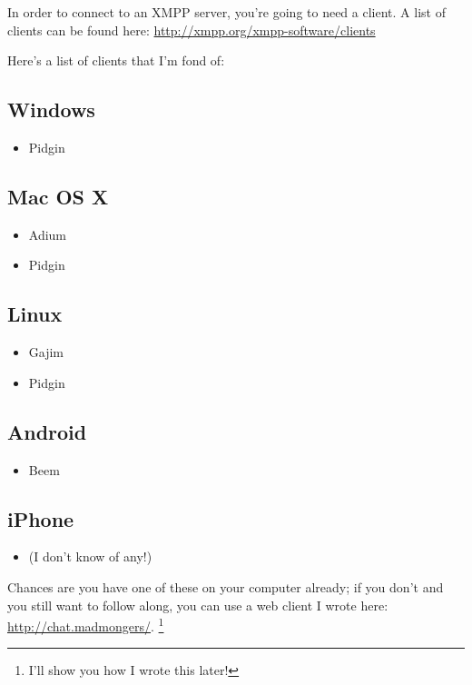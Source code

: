 \newpage

In order to connect to an XMPP server, you're going to need a client.  A list of clients
can be found here: \url{http://xmpp.org/xmpp-software/clients}

Here's a list of clients that I'm fond of:

\subsection*{Windows}

\begin{itemize}
\item Pidgin
\end{itemize}

\subsection*{Mac OS X}

\begin{itemize}
\item Adium
\item Pidgin
\end{itemize}

\subsection*{Linux}

\begin{itemize}
\item Gajim
\item Pidgin
\end{itemize}

\subsection*{Android}

\begin{itemize}
\item Beem
\end{itemize}

\subsection*{iPhone}

\begin{itemize}
\item (I don't know of any!)
\end{itemize}

Chances are you have one of these on your computer already; if you don't and you still
want to follow along, you can use a web client I wrote here: \url{http://chat.madmongers/}.
\footnote{I'll show you how I wrote this later!}
